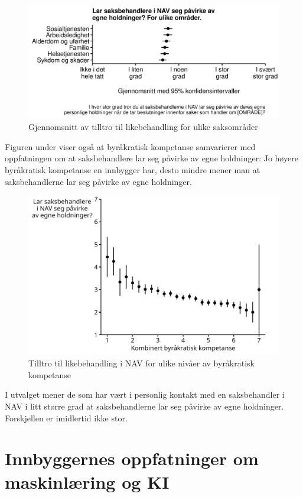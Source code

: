 \documentclass[
  12pt,
  a4paper, 12pt]{article}
\begin{document}
\begin{figure}

{\centering \includegraphics[width=0.8\linewidth]{figs/png/fig_nav_exp_attinfluence_area} 

}

\caption{Gjennomsnitt av tilltro til likebehandling for ulike saksområder}\label{fig:unnamed-chunk-13}
\end{figure}

Figuren under viser også at byråkratisk kompetanse samvarierer med oppfatningen om at saksbehandlere lar seg påvirke av egne holdninger:
Jo høyere byråkratisk kompetanse en innbygger har, desto mindre mener man at saksbehandlerne lar seg påvirke av egne holdninger.

\begin{figure}

{\centering \includegraphics[width=0.6\linewidth]{figs/png/fig_attinfluence_by_be} 

}

\caption{Tilltro til likebehandling i NAV for ulike nivåer av byråkratisk kompetanse}\label{fig:unnamed-chunk-14}
\end{figure}

I utvalget mener de som har vært i personlig kontakt med en saksbehandler i NAV i litt større grad at saksbehandlerne lar seg påvirke av egne holdninger.
Forskjellen er imidlertid ikke stor.

\newpage

\hypertarget{ki}{%
\section{Innbyggernes oppfatninger om maskinlæring og KI}\label{ki}}
\end{document}
